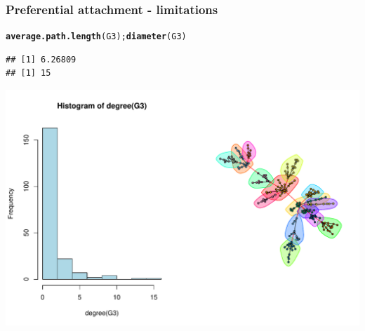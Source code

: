 \documentclass{beamer}\usepackage[]{graphicx}\usepackage[]{color}
\makeatletter
\newcommand{\hlstd}[1]{\textcolor[rgb]{0.345,0.345,0.345}{#1}}%
\newcommand{\hlkwd}[1]{\textcolor[rgb]{0.737,0.353,0.396}{\textbf{#1}}}%
\newenvironment{kframe}{%
 \def\at@end@of@kframe{}%
 \ifinner\ifhmode%
  \def\at@end@of@kframe{\end{minipage}}%
  \begin{minipage}{\columnwidth}%
 \fi\fi%
 \def\FrameCommand##1{\hskip\@totalleftmargin \hskip-\fboxsep
 \colorbox{shadecolor}{##1}\hskip-\fboxsep
     \hskip-\linewidth \hskip-\@totalleftmargin \hskip\columnwidth}%
 \MakeFramed {\advance\hsize-\width
   \@totalleftmargin\z@ \linewidth\hsize
   \@setminipage}}%
 {\par\unskip\endMakeFramed%
 \at@end@of@kframe}
\newenvironment{knitrout}{}{} %
\makeatother
\begin{document}
\begin{frame}[fragile]
  \frametitle{Preferential attachment - limitations}

\begin{knitrout}\scriptsize
{}\color{fgcolor}\begin{kframe}
\begin{alltt}
\hlkwd{average.path.length}\hlstd{(G3);} \hlkwd{diameter}\hlstd{(G3)}
\end{alltt}
\begin{verbatim}
## [1] 6.26809
## [1] 15
\end{verbatim}
\end{kframe}
\end{knitrout}

\begin{knitrout}\scriptsize
{}\color{fgcolor}
\includegraphics[width=.8\textwidth]{figures/PA_limitation2-1} 

\end{knitrout}
\end{frame}
\end{document}
